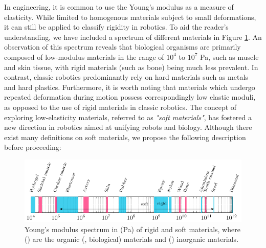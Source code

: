 In engineering, it is common to use the Young's modulus as a measure of elasticity. While limited to homogenous materials subject to small deformations, it can still be applied to classify rigidity in robotics. To aid the reader's understanding, we have included a spectrum of different materials in Figure \ref{fig:1:1}. An observation of this spectrum reveals that biological organisms are primarily composed of low-modulus materials in the range of $10^4$ to $10^7$ \si{Pa}, such as muscle and skin tissue, with rigid materials (such as bone) being much less prevalent. In contrast, classic robotics predominantly rely on hard materials such as metals and hard plastics. Furthermore, it is worth noting that materials which undergo repeated deformation during motion possess correspondingly low elastic moduli, as opposed to the use of rigid materials in classic robotics. The concept of exploring low-elasticity materials, referred to as \emph{"soft materials"}, has fostered a new direction in robotics aimed at unifying robots and biology. Although there exist many definitions on soft materials, we propose the following description before proceeding:
%
\begin{figure}[!t]
    \centering
    \includegraphics*[width=\textwidth]{./pdf/thesis-figure-1-0.pdf}
    \caption{Young's modulus spectrum in (\si{Pa}) of rigid and soft materials, where () are the organic (\ie, biological) materials and () inorganic materials. \label{fig:1:1}}
    \vspace{-4mm}
\end{figure}
%
\
%
